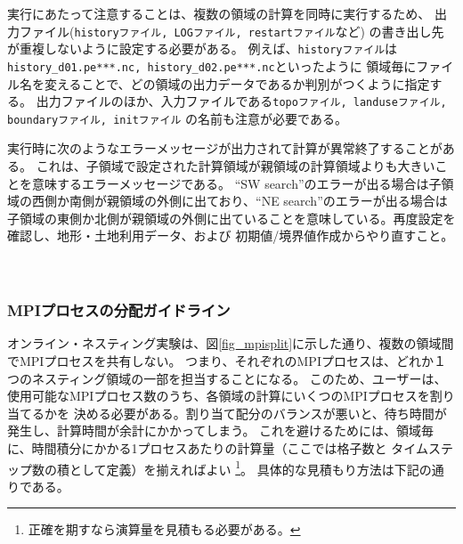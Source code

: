 実行にあたって注意することは、複数の領域の計算を同時に実行するため、
出力ファイル(\verb|historyファイル, LOGファイル, restartファイル|など) の書き出し先が重複しないように設定する必要がある。
例えば、\verb|historyファイル|は\verb|history_d01.pe***.nc, history_d02.pe***.nc|といったように
領域毎にファイル名を変えることで、どの領域の出力データであるか判別がつくように指定する。
出力ファイルのほか、入力ファイルである\verb|topoファイル, landuseファイル, boundaryファイル, initファイル|
の名前も注意が必要である。

実行時に次のようなエラーメッセージが出力されて計算が異常終了することがある。
これは、子領域で設定された計算領域が親領域の計算領域よりも大きいことを意味するエラーメッセージである。
``SW search''のエラーが出る場合は子領域の西側か南側が親領域の外側に出ており、``NE search''のエラーが出る場合は
子領域の東側か北側が親領域の外側に出ていることを意味している。再度設定を確認し、地形・土地利用データ、および
初期値/境界値作成からやり直すこと。\\


\\

\\



\subsubsection{MPIプロセスの分配ガイドライン}
オンライン・ネスティング実験は、図\ref{fig_mpisplit}に示した通り、複数の領域間でMPIプロセスを共有しない。
つまり、それぞれのMPIプロセスは、どれか１つのネスティング領域の一部を担当することになる。
このため、ユーザーは、使用可能なMPIプロセス数のうち、各領域の計算にいくつのMPIプロセスを割り当てるかを
決める必要がある。割り当て配分のバランスが悪いと、待ち時間が発生し、計算時間が余計にかかってしまう。
これを避けるためには、領域毎に、時間積分にかかる1プロセスあたりの計算量（ここでは格子数と
タイムステップ数の積として定義）を揃えればよい
\footnote{正確を期すなら演算量を見積もる必要がある。}。
具体的な見積もり方法は下記の通りである。


